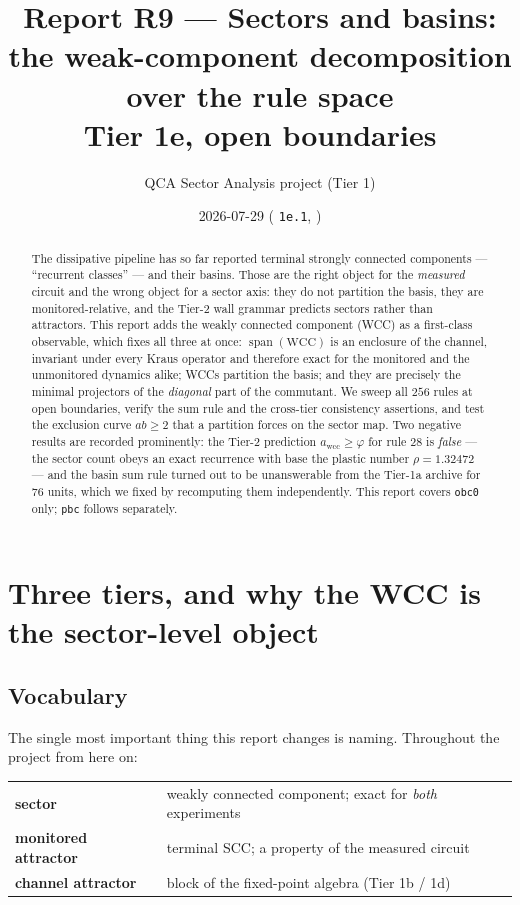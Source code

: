 \documentclass[11pt]{article}
\title{\textbf{Report R9 --- Sectors and basins: the weak-component
decomposition over the rule space}\\
\large Tier 1e, open boundaries}
\author{QCA Sector Analysis project (Tier 1)}
\date{2026-07-29 \quad\small(\fn{tier1e\_version} \texttt{1e.1}, \rt{obc0})}
\newcommand{\rt}[1]{\texttt{#1}}
\newcommand{\wcc}{\mathrm{wcc}}
\theoremstyle{plain}
\theoremstyle{definition}
\begin{document}
\maketitle

\begin{abstract}
The dissipative pipeline has so far reported terminal strongly connected
components --- ``recurrent classes'' --- and their basins. Those are the right
object for the \emph{measured} circuit and the wrong object for a sector axis:
they do not partition the basis, they are monitored-relative, and the Tier-2
wall grammar predicts sectors rather than attractors. This report adds the
weakly connected component (WCC) as a first-class observable, which fixes all
three at once: $\operatorname{span}(\text{WCC})$ is an enclosure of the channel,
invariant under every Kraus operator and therefore exact for the monitored and
the unmonitored dynamics alike; WCCs partition the basis; and they are precisely
the minimal projectors of the \emph{diagonal} part of the commutant. We sweep
all $256$ rules at open boundaries, verify the sum rule and the cross-tier
consistency assertions, and test the exclusion curve $ab\ge2$ that a partition
forces on the sector map. Two negative results are recorded prominently: the
Tier-2 prediction $a_\wcc\ge\varphi$ for rule $28$ is \emph{false} --- the sector
count obeys an exact recurrence with base the plastic number
$\rho=1.32472$ --- and the basin sum rule turned out to be unanswerable from the
Tier-1a archive for $76$ units, which we fixed by recomputing them
independently. This report covers \rt{obc0} only; \rt{pbc} follows separately.
\end{abstract}

\tableofcontents

\section{Three tiers, and why the WCC is the sector-level object}
\label{sec:tiers}

\subsection{Vocabulary}

The single most important thing this report changes is naming. Throughout the
project from here on:

\begin{center}
\begin{tabular}{ll}
\toprule
\textbf{sector} & weakly connected component; exact for \emph{both} experiments\\
\textbf{monitored attractor} & terminal SCC; a property of the measured circuit\\
\textbf{channel attractor} & block of the fixed-point algebra (Tier 1b / 1d)\\
\bottomrule
\end{tabular}
\end{center}
\end{document}
